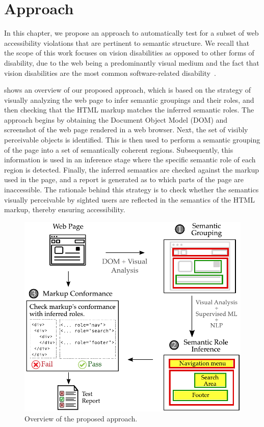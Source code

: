 \section{Approach}

In this chapter, we propose an approach to
automatically test for a subset of web accessibility violations 
that are pertinent to semantic structure.
We recall that the scope of this work focuses on  
vision disabilities as opposed to other forms of disability, 
due to the web being a predominantly visual medium 
and the fact that vision disabilities 
are the most common software-related disability~\cite{2019users_survey}. 

 shows an overview of our 
proposed approach, which is based on the strategy of visually 
analyzing the web page to infer semantic groupings and their roles, 
and then checking that the HTML markup matches the inferred semantic roles.
The approach begins by obtaining the Document Object Model (DOM)
and screenshot of the web page rendered in a web browser.
Next, the set of visibly perceivable objects is identified.  
This is then used to perform a semantic grouping of the page into 
a set of semantically coherent regions. 
Subsequently, this information is used in an 
inference stage where the specific semantic role 
of each region is detected.
Finally, the inferred semantics are checked against the markup
used in the page, and a report is generated as to which 
parts of the page are inaccessible.
The rationale behind this strategy is to check whether 
  the semantics visually perceivable by sighted 
users are reflected in the semantics of the HTML markup,
thereby ensuring accessibility. 

\begin{figure}[t]
    \centering
    \includegraphics[width=0.7\linewidth]{accessibility_testing/figures/approach/approach.pdf}
    \caption{Overview of the proposed approach.}
    \label{fig:approach}
\end{figure}

